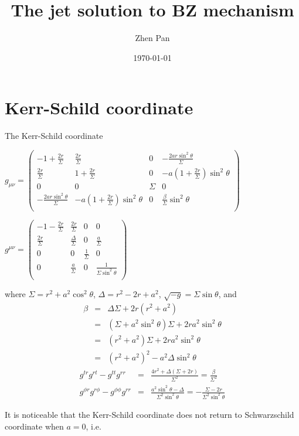 \documentclass[aps,prd,preprint,groupedaddress]{revtex4-1}
\def\nn{\nonumber}
\def\beqn{\begin{eqnarray}}
\def\eeqn{\end{eqnarray}}
\def\sst{\sin^2\theta}
\begin{document}
\title{The jet solution to BZ mechanism}
\author{Zhen Pan}
\date{\today}

\section{Kerr-Schild coordinate}
The Kerr-Schild coordinate

$g_{\mu\nu}=\left(
  \begin{array}{cccc}
    -1+\frac{2r}{\Sigma} & \frac{2r}{\Sigma} & 0 & -\frac{2a r \sin^2\theta}{\Sigma} \\
    \frac{2r}{\Sigma}& 1+\frac{2r}{\Sigma} & 0 & -a(1+\frac{2r}{\Sigma})\sin^2\theta \\
    0 & 0 & \Sigma & 0 \\
   -\frac{2a r \sin^2\theta}{\Sigma} & -a(1+\frac{2r}{\Sigma})\sin^2\theta & 0 & \frac{\beta}{\Sigma}\sst \\
  \end{array}
\right)$

$g^{\mu\nu}=\left(
  \begin{array}{cccc}
    -1-\frac{2r}{\Sigma} & \frac{2r}{\Sigma} & 0 & 0 \\
    \frac{2r}{\Sigma}& \frac{\Delta}{\Sigma} & 0 & \frac{a}{\Sigma} \\
    0 & 0 &  \frac{1}{\Sigma}  & 0 \\
   0 &  \frac{a}{\Sigma}  & 0 & \frac{1}{\Sigma\sin^2\theta} \\
  \end{array}
\right)$

where $\Sigma=r^2+a^2 \cos^2\theta$, $\Delta=r^2-2r+a^2$, $\sqrt{-g}=\Sigma\sin\theta$, and
\beqn
\beta
&=& \Delta\Sigma + 2r(r^2+a^2) \nn\\
&=& (\Sigma+a^2\sst)\Sigma+ 2ra^2\sst \nn\\
&=& (r^2+a^2)\Sigma + 2ra^2\sst \nn\\
&=& (r^2+a^2)^2-a^2 \Delta \sst
\eeqn
\beqn
g^{tr}g^{rt}-g^{tt}g^{rr}&=&\frac{4r^2+\Delta(\Sigma+2r)}{\Sigma^2} = \frac{\beta}{\Sigma^2} \nn\\
g^{\phi r}g^{r\phi}-g^{\phi\phi}g^{rr}&=&\frac{a^2\sst-\Delta}{\Sigma^2\sst} = -\frac{\Sigma-2r}{\Sigma^2\sst}
\eeqn

It is noticeable that the Kerr-Schild coordinate does not return to Schwarzschild coordinate when $a=0$, i.e.
\end{document}
